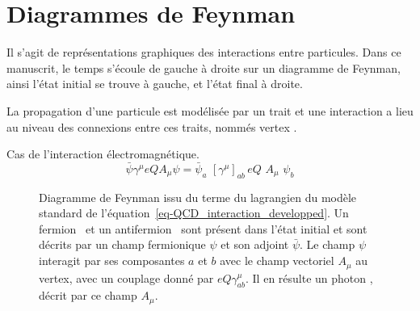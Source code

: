 \chapter{Diagrammes de Feynman}\label{annexe-fmf}

Il s'agit de représentations graphiques des interactions entre particules. Dans ce manuscrit, le temps s'écoule de gauche à droite sur un diagramme de Feynman, ainsi l'état initial se trouve à gauche, et l'état final à droite.

La propagation d'une particule est modélisée par un trait et une interaction a lieu au niveau des connexions entre ces traits, nommés \og vertex \fg.


Cas de l'interaction électromagnétique.
\begin{equation}
\bar{\psi}\gamma^\mu eQA_\mu \psi
=
\bar{\psi}_a \,\, [\gamma^\mu]_{ab} \, eQ \,\, A_\mu \,\, \psi_b
\label{eq-QCD_interaction_developped}
\end{equation}
\begin{figure}[h]
\centering
\vspace{\baselineskip}

\vspace{\baselineskip}
\caption[Diagramme de Feynman issu du terme~\eqref{eq-QCD_interaction_developped}.]{Diagramme de Feynman issu du terme du lagrangien du modèle standard de l'équation~\eqref{eq-QCD_interaction_developped}. Un fermion \fermion\ et un antifermion \antifermion\ sont présent dans l'état initial et sont décrits par un champ fermionique $\psi$ et son adjoint $\bar{\psi}$. Le champ $\psi$ interagit par ses composantes $a$ et $b$ avec le champ vectoriel $A_\mu$ au vertex, avec un couplage donné par $eQ\gamma^\mu_{ab}$. Il en résulte un photon \photon, décrit par ce champ $A_\mu$.}
\label{fig-fgraph-ff_Gamma1-large-annexeB}
\end{figure}